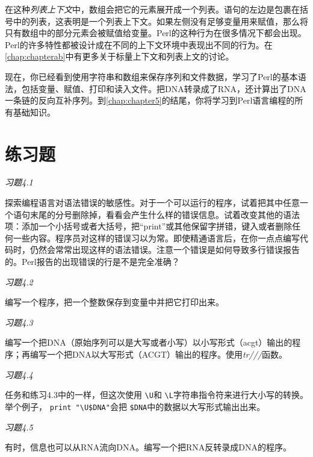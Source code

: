 在这种\textit{列表上下文}中，数组会把它的元素展开成一个列表。语句的左边是包裹在括号中的列表，这表明是一个列表上下文。如果左侧没有足够变量用来赋值，那么将只有数组中的部分元素会被赋值给变量。Perl的这种行为在很多情况下都会出现。Perl的许多特性都被设计成在不同的上下文环境中表现出不同的行为。在\autoref{chap:chapterab}中有更多关于标量上下文和列表上文的讨论。

现在，你已经看到使用字符串和数组来保存序列和文件数据，学习了Perl的基本语法，包括变量、赋值、打印和读入文件。把DNA转录成了RNA，还计算出了DNA一条链的反向互补序列。到\autoref{chap:chapter5}的结尾，你将学习到Perl语言编程的所有基础知识。

\section{练习题}
\textcolor{black}{\textit{习题4.1}}
\begin{adjustwidth}{4em}{}
探索编程语言对语法错误的敏感性。对于一个可以运行的程序，试着把其中任意一个语句末尾的分号删除掉，看看会产生什么样的错误信息。试着改变其他的语法项：添加一个小括号或者大括号，把“print”或其他保留字拼错，键入或者删除任何一些内容。程序员对这样的错误习以为常。即使精通语言后，在你一点点编写代码时，仍然会常常出现这样的语法错误。注意一个错误是如何导致多行错误报告的。Perl报告的出现错误的行是不是完全准确？
\end{adjustwidth}

\textcolor{black}{\textit{习题4.2}}
\begin{adjustwidth}{4em}{}
编写一个程序，把一个整数保存到变量中并把它打印出来。
\end{adjustwidth}

\textcolor{black}{\textit{习题4.3}}
\begin{adjustwidth}{4em}{}
编写一个把DNA（原始序列可以是大写或者小写）以小写形式（acgt）输出的程序；再编写一个把DNA以大写形式（ACGT）输出的程序。使用\textit{tr///}函数。
\end{adjustwidth}

\textcolor{black}{\textit{习题4.4}}
\begin{adjustwidth}{4em}{}
任务和练习4.3中的一样，但这次使用 \verb|\U|和 \verb|\L|字符串指令符来进行大小写的转换。举个例子， \verb|print "\U$DNA"|会把 \verb|$DNA|中的数据以大写形式输出出来。
\end{adjustwidth}

\textcolor{black}{\textit{习题4.5}}
\begin{adjustwidth}{4em}{}
有时，信息也可以从RNA流向DNA。编写一个把RNA反转录成DNA的程序。
\end{adjustwidth}

